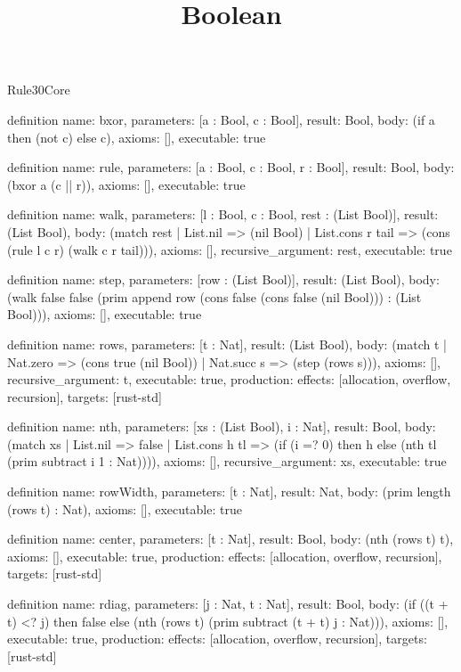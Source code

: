 \begin{lexlean}{Rule30Core}
\title{Boolean}
\begin{semanticmodule}
definition{
  name: bxor,
  parameters: [a : Bool, c : Bool],
  result: Bool,
  body: (if a then (not c) else c),
  axioms: [],
  executable: true
}

definition{
  name: rule,
  parameters: [a : Bool, c : Bool, r : Bool],
  result: Bool,
  body: (bxor a (c || r)),
  axioms: [],
  executable: true
}

definition{
  name: walk,
  parameters: [l : Bool, c : Bool, rest : (List Bool)],
  result: (List Bool),
  body: (match rest
    | List.nil => (nil Bool)
    | List.cons r tail => (cons (rule l c r) (walk c r tail))),
  axioms: [],
  recursive_argument: rest,
  executable: true
}

definition{
  name: step,
  parameters: [row : (List Bool)],
  result: (List Bool),
  body: (walk false false (prim append row (cons false (cons false (nil Bool))) : (List Bool))),
  axioms: [],
  executable: true
}

definition{
  name: rows,
  parameters: [t : Nat],
  result: (List Bool),
  body: (match t
    | Nat.zero => (cons true (nil Bool))
    | Nat.succ s => (step (rows s))),
  axioms: [],
  recursive_argument: t,
  executable: true,
  production: {effects: [allocation, overflow, recursion], targets: [rust-std]}
}

definition{
  name: nth,
  parameters: [xs : (List Bool), i : Nat],
  result: Bool,
  body: (match xs
    | List.nil => false
    | List.cons h tl => (if (i =? 0) then h else (nth tl (prim subtract i 1 : Nat)))),
  axioms: [],
  recursive_argument: xs,
  executable: true
}

definition{
  name: rowWidth,
  parameters: [t : Nat],
  result: Nat,
  body: (prim length (rows t) : Nat),
  axioms: [],
  executable: true
}

definition{
  name: center,
  parameters: [t : Nat],
  result: Bool,
  body: (nth (rows t) t),
  axioms: [],
  executable: true,
  production: {effects: [allocation, overflow, recursion], targets: [rust-std]}
}

definition{
  name: rdiag,
  parameters: [j : Nat, t : Nat],
  result: Bool,
  body: (if ((t + t) <? j) then false else (nth (rows t) (prim subtract (t + t) j : Nat))),
  axioms: [],
  executable: true,
  production: {effects: [allocation, overflow, recursion], targets: [rust-std]}
}


\end{semanticmodule}
\end{lexlean}

